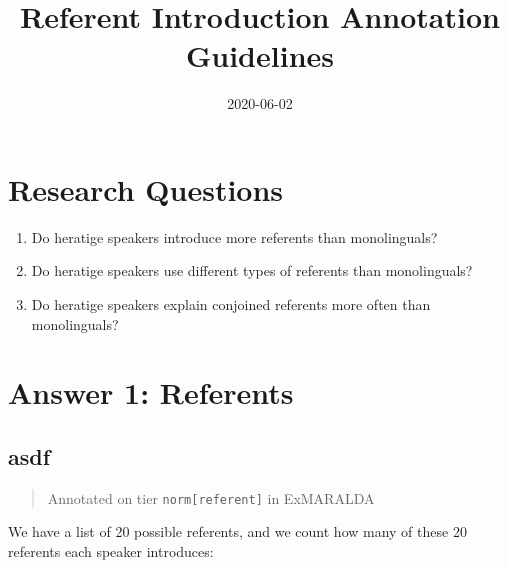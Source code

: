 \documentclass[
]{book}
\title{Referent Introduction Annotation Guidelines}
\author{}
\date{\vspace{-2.5em}2020-06-02}
\begin{document}
\maketitle

{
\setcounter{tocdepth}{1}
\tableofcontents
}
\hypertarget{research-questions}{%
\chapter{Research Questions}\label{research-questions}}

\begin{enumerate}
\def\labelenumi{\arabic{enumi}.}
\item
  Do heratige speakers introduce more referents than monolinguals?
\item
  Do heratige speakers use different types of referents than monolinguals?
\item
  Do heratige speakers explain conjoined referents more often than monolinguals?
\end{enumerate}

\hypertarget{answer-1-referents}{%
\chapter{Answer 1: Referents}\label{answer-1-referents}}

\hypertarget{asdf}{%
\section{asdf}\label{asdf}}

\begin{quote}
Annotated on tier \texttt{norm{[}referent{]}} in ExMARALDA
\end{quote}

We have a list of 20 possible referents, and we count how many of these 20 referents each speaker introduces:
\end{document}
